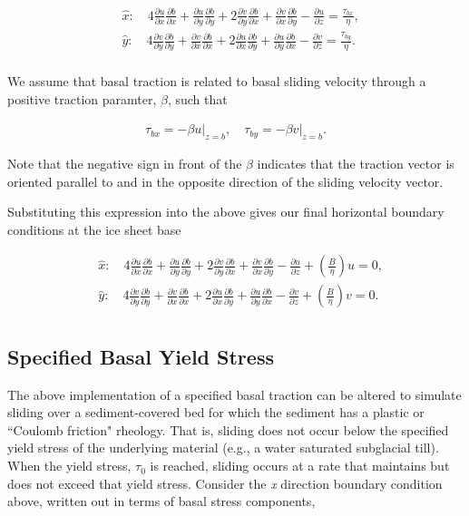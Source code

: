 \begin{align*}
  & \hat{x}:\quad 4\frac{\partial u}{\partial x}\frac{\partial b}{\partial x}+\frac{\partial u}{\partial y}\frac{\partial b}{\partial y}+2\frac{\partial v}{\partial y}\frac{\partial b}{\partial x}+\frac{\partial v}{\partial x}\frac{\partial b}{\partial y}-\frac{\partial u}{\partial z}=\frac{\tau _{bx}}{\eta }, \\ 
 & \hat{y}:\quad 4\frac{\partial v}{\partial y}\frac{\partial b}{\partial y}+\frac{\partial v}{\partial x}\frac{\partial b}{\partial x}+2\frac{\partial u}{\partial x}\frac{\partial b}{\partial y}+\frac{\partial u}{\partial y}\frac{\partial b}{\partial x}-\frac{\partial v}{\partial z}=\frac{\tau _{by}}{\eta }. \\
 \end{align*}

We assume that basal traction is related to basal sliding velocity through a positive traction paramter, $\beta$, such that

\begin{align*}
\tau _{bx}=\left. -\beta u \right|_{z=b},\quad \tau _{by}=\left. -\beta v \right|_{z=b}.
\end{align*}

Note that the negative sign in front of the $\beta$ indicates that the traction vector is oriented parallel to and in the opposite direction of the sliding velocity vector.

Substituting this expression into the above gives our final horizontal boundary conditions at the ice sheet base

\begin{align*}
  & \hat{x}:\quad 4\frac{\partial u}{\partial x}\frac{\partial b}{\partial x}+\frac{\partial u}{\partial y}\frac{\partial b}{\partial y}+2\frac{\partial v}{\partial y}\frac{\partial b}{\partial x}+\frac{\partial v}{\partial x}\frac{\partial b}{\partial y}-\frac{\partial u}{\partial z}+\left( \frac{B}{\eta } \right)u=0, \\ 
 & \hat{y}:\quad 4\frac{\partial v}{\partial y}\frac{\partial b}{\partial y}+\frac{\partial v}{\partial x}\frac{\partial b}{\partial x}+2\frac{\partial u}{\partial x}\frac{\partial b}{\partial y}+\frac{\partial u}{\partial y}\frac{\partial b}{\partial x}-\frac{\partial v}{\partial z}+\left( \frac{B}{\eta } \right)v=0. \\
 \end{align*}

\subsection{Specified Basal Yield Stress}
The above implementation of a specified basal traction can be altered to simulate sliding over a sediment-covered bed for which the sediment has a plastic or ``Coulomb friction" rheology. That is, sliding does not occur below the specified yield stress of the underlying material (e.g., a water saturated subglacial till). When the yield stress, $\tau_0$ is reached, sliding occurs at a rate that maintains but does not exceed that yield stress. Consider the \textit{x} direction boundary condition above, written out in terms of basal stress components,

